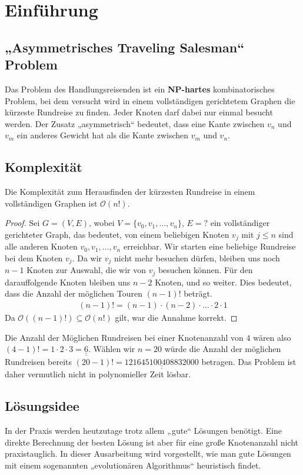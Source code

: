 \section{Einführung}
\subsection{„Asymmetrisches Traveling Salesman“ Problem}
Das Problem des Handlungsreisenden ist ein
\textbf{NP-hartes} kombinatorisches Problem, bei dem versucht wird in
einem vollständigen gerichtetem Graphen die kürzeste Rundreise zu finden. Jeder
Knoten darf dabei nur einmal besucht werden. Der Zusatz „asymmetrisch“
bedeutet, dass eine Kante zwischen $v_n$ und $v_m$ ein anderes Gewicht
hat als die Kante zwischen $v_m$ und $v_n$.

\subsection{Komplexität}
\begin{theorem}
Die Komplexität zum Herausfinden der kürzesten Rundreise in einem
vollständigen Graphen ist $\mathcal{O}(n!)$. 
\end{theorem}

\begin{proof}
Sei $G=(V,E)$, wobei $V = \{ v_0, v_1, \dotsc, v_n\}$, $E= ?$ ein
vollständiger gerichteter Graph, das bedeutet, von einem
beliebigen Knoten $v_j$ mit $j \leq n$ sind alle anderen Knoten $v_0, v_1, \dotsc, v_n$
erreichbar. Wir starten eine beliebige Rundreise bei dem Knoten $v_j$.
Da wir $v_j$ nicht mehr besuchen dürfen, bleiben uns noch 
$n-1$ Knoten zur Auswahl, die wir von $v_j$ besuchen können. Für den
darauffolgende Knoten bleiben uns $n-2$ Knoten, und so weiter. Dies bedeutet, dass 
die Anzahl der möglichen Touren $(n-1)!$ beträgt.
\begin{align*}
  (n-1)! = (n-1) \cdot (n-2) \cdot \dotsc \cdot 2 \cdot 1
\end{align*}
Da $\mathcal{O}((n-1)!) \subseteq \mathcal{O}(n!)$ gilt, war die Annahme
korrekt.
\end{proof}
\begin{bem}
Die Anzahl der Möglichen Rundreisen bei einer Knotenanzahl von $4$ wären also
$(4-1)! = 1 \cdot 2 \cdot 3 =\underline{\underline{6}}$. Wählen wir $n = 20$ würde die
Anzahl der möglichen Rundreisen bereits $(20-1)! =
\underline{\underline{121645100408832000}}$ betragen.
Das Problem ist daher vermutlich nicht in polynomieller Zeit lösbar.
\end{bem}

\subsection{Lösungsidee}
In der Praxis werden heutzutage trotz allem „gute“ Lösungen benötigt.
Eine direkte Berechnung der besten Lösung ist aber für eine große
Knotenanzahl nicht praxistauglich. In dieser Ausarbeitung wird
vorgestellt, wie man gute Lösungen mit einem sogenannten „evolutionären
Algorithmus“ heuristisch findet.
